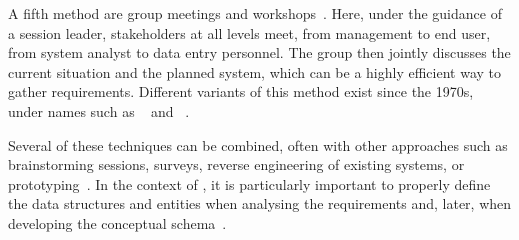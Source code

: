 A fifth method are group meetings and workshops~\cite{Z2003RDARS}.
Here, under the guidance of a session leader, stakeholders at all levels meet, from management to end user, from system analyst to data entry personnel.
The group then jointly discusses the current situation and the planned system, which can be a highly efficient way to gather requirements.
Different variants of this method exist since the 1970s, under names such as ~\cite{CWG1993PAJADATC,M1996RTWSS} and ~\cite{CWG1993PAJADATC,FMRSW1989OOSAATSDASD}.

Several of these techniques can be combined, often with other approaches such as brainstorming sessions, surveys, reverse engineering of existing systems, or prototyping~\cite{I2018SAH,Z2003RDARS}.
In the context of \dbs, it is particularly important to properly define the data structures and entities when analysing the requirements and, later, when developing the conceptual schema~\cite{M1987DFADSMFDRACS}.%
%
\endhsection%
%
%
%
\endhsection%
%
